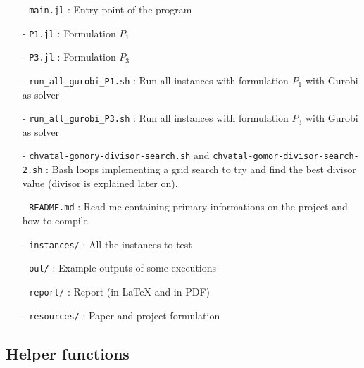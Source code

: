 \documentclass[a4paper,10pt]{article}
\begin{document}
\begin{itemize}
    \item[-] \texttt{main.jl} : Entry point of the program
    \item[-] \texttt{P1.jl} : Formulation $P_1$
    \item[-] \texttt{P3.jl} : Formulation $P_3$
    \item[-] \texttt{run\_all\_gurobi\_P1.sh} : Run all instances with formulation $P_1$ with Gurobi as solver 
    \item[-] \texttt{run\_all\_gurobi\_P3.sh} : Run all instances with formulation $P_3$ with Gurobi as solver 
    \item[-] \texttt{chvatal-gomory-divisor-search.sh} and \texttt{chvatal-gomor-divisor-search-2.sh} : Bash loops implementing a grid search to try and find the best divisor value (divisor is explained later on).
    \item[-] \texttt{README.md} : Read me containing primary informations on the project and how to compile
    \item[-] \texttt{instances/} : All the instances to test
    \item[-] \texttt{out/} : Example outputs of some executions
    \item[-] \texttt{report/} : Report (in \LaTeX \; and in PDF)
    \item[-] \texttt{resources/} : Paper and project formulation
    \end{itemize}
    
\subsection{Helper functions} 
\end{document}
